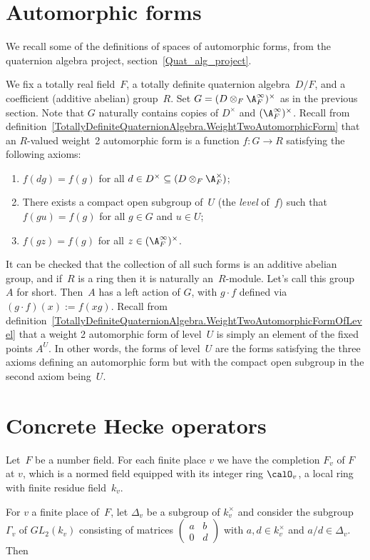 \section{Automorphic forms}

We recall some of the definitions of spaces of automorphic forms, from
the quaternion algebra project, section~\ref{Quat_alg_project}.

We fix a totally real field~$F$, a
totally definite quaternion algebra~$D/F$, and a coefficient (additive abelian) group~$R$.
Set $G=(D\otimes_F\A_F^\infty)^\times$ as in the previous section. Note that $G$
naturally contains copies of $D^\times$ and $(\A_F^\infty)^\times$. Recall from
definition~\ref{TotallyDefiniteQuaternionAlgebra.WeightTwoAutomorphicForm}
that an $R$-valued weight~2 automorphic form
is a function $f:G\to R$ satisfying the following axioms:
\begin{enumerate}
  \item $f(dg)=f(g)$ for all $d\in D^\times\subseteq(D\otimes_F\A_F^\times)$;
  \item There exists a compact open subgroup of~$U$ (the \emph{level} of~$f$)
    such that $f(gu)=f(g)$ for all $g\in G$ and $u\in U$;
  \item $f(gz)=f(g)$ for all $z\in(\A_F^\infty)^\times$.
\end{enumerate}

It can be checked that the collection of all such forms is an additive abelian group,
and if~$R$ is a ring then it is naturally an~$R$-module. Let's call this group~$A$ for short.
Then~$A$ has a left action of $G$, with $g\cdot f$
defined via $(g\cdot f)(x):=f(xg)$. Recall from
definition~\ref{TotallyDefiniteQuaternionAlgebra.WeightTwoAutomorphicFormOfLevel}
that a weight 2 automorphic form of level~$U$ is simply an element of the
fixed points $A^U$. In other words, the forms of level~$U$ are the forms satisfying the three axioms
defining an automorphic form but with the compact open subgroup in the second
axiom being~$U$.

\section{Concrete Hecke operators}

Let~$F$ be a number field. For each finite place $v$ we have the completion $F_v$ of $F$ at $v$,
which is a normed field equipped with its integer ring $\calO_v$, a local ring with
finite residue field~$k_v$.

For $v$ a finite place of~$F$, let $\Delta_v$ be a subgroup of $k_v^\times$ and consider
the subgroup $\Gamma_v$ of $GL_2(k_v)$ consisting of matrices $\begin{pmatrix}a&b\\0&d\end{pmatrix}$
with $a,d\in k_v^\times$ and $a/d\in\Delta_v$. Then

